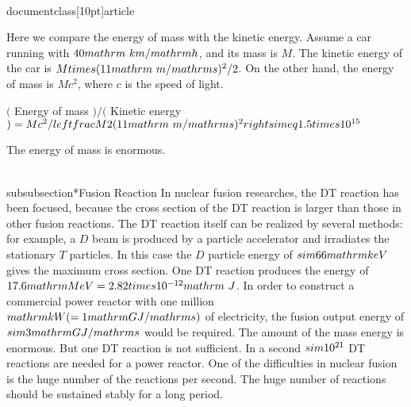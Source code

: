 \\documentclass[10pt]{article}
\begin{document}
{{{{{{Here we compare the energy of mass with the kinetic energy. Assume a car running with $40 \\mathrm{~km} / \\mathrm{h}$, and its mass is $M$. The kinetic energy of the car is $M \\times(11 \\mathrm{~m} / \\mathrm{s})^{2} / 2$. On the other hand, the energy of mass is $M c^{2}$, where $c$ is the speed of light.

$($ Energy of mass $) /($ Kinetic energy $)=M c^{2} /\\left\\{\\frac{M}{2}(11 \\mathrm{~m} / \\mathrm{s})^{2}\\right\\} \\simeq 1.5 \\times 10^{15}$

The energy of mass is enormous.

\\subsubsection*{Fusion Reaction}
In nuclear fusion researches, the DT reaction has been focused, because the cross section of the DT reaction is larger than those in other fusion reactions. The DT reaction itself can be realized by several methods: for example, a $D$ beam is produced by a particle accelerator and irradiates the stationary $T$ particles. In this case the $D$ particle energy of $\\sim 66 \\mathrm{keV}$ gives the maximum cross section. One DT reaction produces the energy of $17.6 \\mathrm{MeV}=2.82 \\times 10^{-12} \\mathrm{~J}$. In order to construct a commercial power reactor with one million $\\mathrm{kW}(=1 \\mathrm{GJ} / \\mathrm{s})$ of electricity, the fusion output energy of $\\sim 3 \\mathrm{GJ} / \\mathrm{s}$ would be required. The amount of the mass energy is enormous. But one DT reaction is not sufficient. In a second $\\sim 10^{21}$ DT reactions are needed for a power reactor. One of the difficulties in nuclear fusion is the huge number of the reactions per second. The huge number of reactions should be sustained stably for a long period.

}}}}}}
\end{document}
